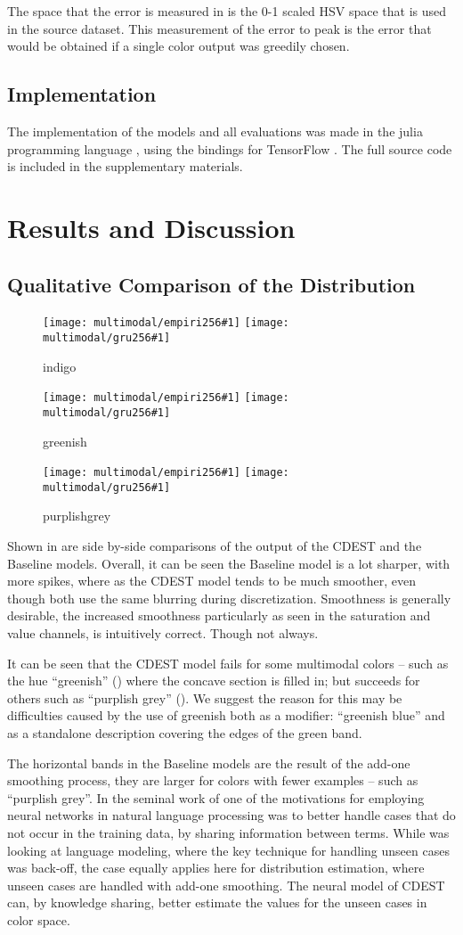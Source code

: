 \documentclass[11pt,letterpaper]{article}
\newcommand{\multimodalfig}[1]{
	\begin{figure}
		\texttt{[image: multimodal/empiri256\#1]}
		\texttt{[image: multimodal/gru256\#1]}	
		\caption{\label{fig#1} #1}
	\end{figure}
}
\newcommand{\parencite}{\cite}
\newcommand{\textcite}{\newcite}
\begin{document}
The space that the error is measured in is the 0-1 scaled HSV space that is used in the source dataset.
This measurement of the error to peak is the error that would be obtained if a single color output was greedily chosen.


\subsection{Implementation}
The implementation of the models and all evaluations was made in the julia programming language \parencite{Julia},
using the bindings for TensorFlow \parencite{tensorflow2015-whitepaper}.
The full source code is included in the supplementary materials.

\section{Results and Discussion}\label{sec:results-and-discussion}

\subsection{Qualitative Comparison of the Distribution}\label{resultsdistributions}

\multimodalfig{indigo}
\multimodalfig{greenish}
\multimodalfig{purplishgrey}



Shown in  are side by-side comparisons of the output of the CDEST and the Baseline models.
Overall, it can be seen the Baseline model is a lot sharper, with more spikes,
where as the CDEST model tends to be much smoother, even though both use the same blurring during discretization.
Smoothness is generally desirable, the increased smoothness particularly as seen in the saturation and value channels, is intuitively correct.
Though not always.

It can be seen that the CDEST model fails for some multimodal colors -- such as the hue ``greenish'' () where the concave section is filled in;
but succeeds for others such as ``purplish grey'' ().
We suggest the reason for this may be difficulties caused by the use of greenish both as a modifier: ``greenish blue'' and as a standalone description covering the edges of the green band.

The horizontal bands in the Baseline models are the result of the add-one smoothing process, they are larger for colors with fewer examples -- such as ``purplish grey''.
In the seminal work of \textcite{NPLM} one of the motivations for employing neural networks in natural language processing was to better handle cases that do not occur in the training data, by sharing information between terms.
While \textcite{NPLM} was looking at language modeling, where the key technique for handling unseen cases was back-off, the case equally applies here for distribution estimation, where unseen cases are handled with add-one smoothing.
The neural model of CDEST can, by knowledge sharing, better estimate the values for the unseen cases in color space.
 
\end{document}
